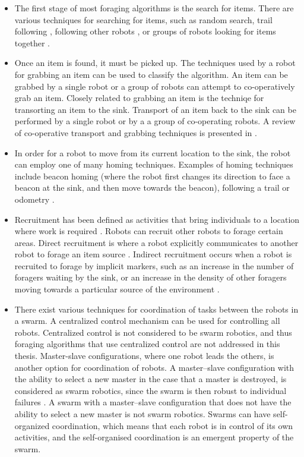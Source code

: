 \begin{itemize}
\item The first stage of most foraging algorithms is the search for items. There are various techniques for searching for items, such as random search, trail following \cite{schmickl2006trophallaxis}, following other robots \cite{dorigo2013swarmanoid, werger1996robotic}, or groups of robots looking for items together \cite{vincent2004framework}.

\item Once an item is found, it must be picked up. The techniques used by a robot for grabbing an item can be used to classify the algorithm. An item can be grabbed by a single robot or a group of robots can attempt to co-operatively grab an item. Closely related to grabbing an item is the techniqe for transorting an item to the sink. Transport of an item back to the sink can be performed by a single robot or by a a group of co-operating robots. A review of co-operative transport and grabbing techniques is presented in \cite{kube2000cooperative}.

\item In order for a robot to move from its current location to the sink, the robot can employ one of many homing techniques. Examples of homing techniques include beacon homing (where the robot first changes its direction to face a beacon at the sink, and then move towards the beacon), following a trail or odometry \cite{winfield2009towards}.

\item Recruitment has been defined as activities that bring individuals to a location where work is required \cite{holldobler1990ants}. Robots can recruit other robots to forage certain areas. Direct recruitment is where a robot explicitly communicates to another robot to forage an item source \cite{krieger2000ant,labella2006division}. Indirect recruitment occurs when a robot is recruited to forage by implicit markers, such as an increase in the number of foragers waiting by the sink, or an increase in the density of other foragers moving towards a particular source of the environment \cite{arkin1992cooperation}. 

\item There exist various techniques for coordination of tasks between the robots in a swarm. A centralized control mechanism can be used for controlling all robots. Centralized control is not considered to be swarm robotics, and thus foraging algorithms that use centralized control are not addressed in this thesis. Master-slave configurations, where one robot leads the others, is another option for coordination of robots. A master--slave configuration with the ability to select a new master in the case that a master is destroyed, is considered as swarm robotics, since the swarm is then robust to individual failures \cite{karpov2015leader, hoeing2007auction}. A swarm with a master--slave configuration that does not have the ability to select a new master is not swarm robotics. Swarms can have self-organized coordination, which means that each robot is in control of its own activities, and the self-organised coordination is an emergent property of the swarm. %
\end{itemize}



